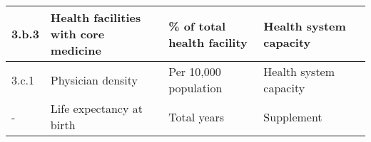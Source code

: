 \begin{sidewaystable}
\begin{tabularx}{\textwidth}{|p{1cm}|p{7.4cm}|p{5.5cm}|p{5.8cm}|p{2.7cm}|}
        \hline
        3.b.3 & Health facilities with core medicine & \% of total health facility & Health system capacity & \textcite{unsdg_sustainable_2023}\\
        \hline
        3.c.1 & Physician density & Per 10,000 population & Health system capacity & \textcite{unsdg_sustainable_2023}\\
        \hline
        - & Life expectancy at birth & Total years & Supplement & \textcite{wdi_world_2023}\\
        \hline
    \end{tabularx}
    \label{Tab::health indicators}
\end{sidewaystable}
